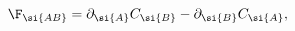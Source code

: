 \begin{equation}\label{eq:fab}
\F_{\si{AB}}=\partial_{\si{A}} C_{\si{B}} -\partial_{\si{B}}
C_{\si{A}},
\end{equation}

